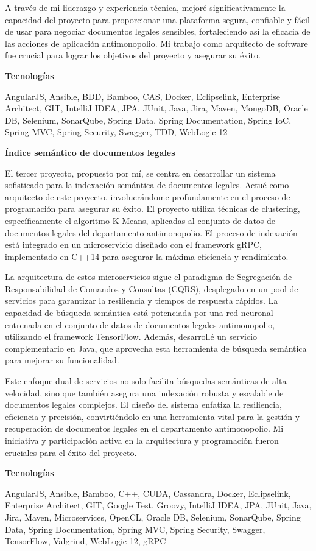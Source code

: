 \documentclass[a4paper,10pt]{article}
\newcommand{\cvsubsubsection}[1]{
\begin{tcolorbox}[colback=gray!10, colframe=gray!10, boxrule=0pt, arc=0mm, outer arc=0mm, width=\textwidth, boxsep=0pt, left=4mm, right=4mm, top=1mm, bottom=1mm]
  \textbf{#1}
\end{tcolorbox}
\vspace{1mm}
}
\newcommand{\cvsubsubsubsection}[1]{
  \begin{tcolorbox}[colback=gray!5, colframe=gray!5, boxrule=0pt, arc=0mm, outer arc=0mm, width=\textwidth, boxsep=0pt, left=6mm, right=6mm, top=1mm, bottom=1mm]
    \textbf{#1}
  \end{tcolorbox}
  \vspace{1mm}
}
\begin{document}
A través de mi liderazgo y experiencia técnica, mejoré significativamente la capacidad del proyecto para proporcionar una plataforma segura, confiable y fácil de usar para negociar documentos legales sensibles, fortaleciendo así la eficacia de las acciones de aplicación antimonopolio. Mi trabajo como arquitecto de software fue crucial para lograr los objetivos del proyecto y asegurar su éxito.

\cvsubsubsubsection{Tecnologías}
AngularJS, Ansible, BDD, Bamboo, CAS, Docker, Eclipselink, Enterprise Architect, GIT, IntelliJ IDEA, JPA, JUnit, Java, Jira, Maven, MongoDB, Oracle DB, Selenium, SonarQube, Spring Data, Spring Documentation, Spring IoC, Spring MVC, Spring Security, Swagger, TDD, WebLogic 12

\cvsubsubsection{Índice semántico de documentos legales}
El tercer proyecto, propuesto por mí, se centra en desarrollar un sistema sofisticado para la indexación semántica de documentos legales. Actué como arquitecto de este proyecto, involucrándome profundamente en el proceso de programación para asegurar su éxito. El proyecto utiliza técnicas de clustering, específicamente el algoritmo K-Means, aplicadas al conjunto de datos de documentos legales del departamento antimonopolio. El proceso de indexación está integrado en un microservicio diseñado con el framework gRPC, implementado en C++14 para asegurar la máxima eficiencia y rendimiento.

La arquitectura de estos microservicios sigue el paradigma de Segregación de Responsabilidad de Comandos y Consultas (CQRS), desplegado en un pool de servicios para garantizar la resiliencia y tiempos de respuesta rápidos. La capacidad de búsqueda semántica está potenciada por una red neuronal entrenada en el conjunto de datos de documentos legales antimonopolio, utilizando el framework TensorFlow. Además, desarrollé un servicio complementario en Java, que aprovecha esta herramienta de búsqueda semántica para mejorar su funcionalidad.

Este enfoque dual de servicios no solo facilita búsquedas semánticas de alta velocidad, sino que también asegura una indexación robusta y escalable de documentos legales complejos. El diseño del sistema enfatiza la resiliencia, eficiencia y precisión, convirtiéndolo en una herramienta vital para la gestión y recuperación de documentos legales en el departamento antimonopolio. Mi iniciativa y participación activa en la arquitectura y programación fueron cruciales para el éxito del proyecto.

\cvsubsubsubsection{Tecnologías}
AngularJS, Ansible, Bamboo, C++, CUDA, Cassandra, Docker, Eclipselink, Enterprise Architect, GIT, Google Test, Groovy, IntelliJ IDEA, JPA, JUnit, Java, Jira, Maven, Microservices, OpenCL, Oracle DB, Selenium, SonarQube, Spring Data, Spring Documentation, Spring MVC, Spring Security, Swagger, TensorFlow, Valgrind, WebLogic 12, gRPC
\end{document}
